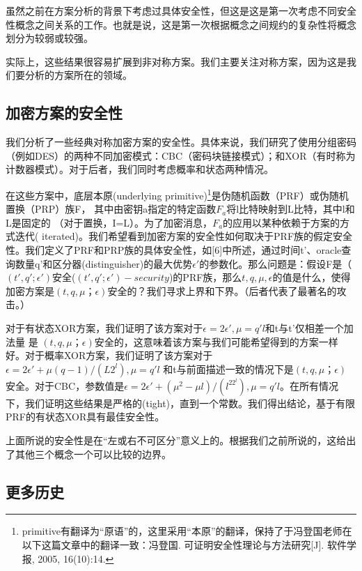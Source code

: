 \documentclass[]{article}
\begin{document}
虽然之前在方案分析的背景下考虑过具体安全性，但这是这是第一次考虑不同安全性概念之间关系的工作。也就是说，这是第一次根据概念之间规约的复杂性将概念划分为较弱或较强。\par

实际上，这些结果很容易扩展到非对称方案。我们主要关注对称方案，因为这是我们要分析的方案所在的领域。

\subsection{加密方案的安全性}

我们分析了一些经典对称加密方案的安全性。具体来说，我们研究了使用分组密码（例如DES）的两种不同加密模式：CBC（密码块链接模式）；和XOR（有时称为计数器模式）。对于后者，我们同时考虑概率和状态两种情况。\par

在这些方案中，底层本原(underlying primitive)\footnote{primitive有翻译为“原语”的，这里采用“本原”的翻译，保持了于冯登国老师在以下这篇文章中的翻译一致：冯登国. 可证明安全性理论与方法研究[J]. 软件学报, 2005, 16(10):14.}是伪随机函数（PRF）或伪随机置换（PRP）族F，
其中由密钥a指定的特定函数$F_a$将l比特映射到L比特，其中l和L是固定的
（对于置换，I=L）。为了加密消息，$F_a$的应用以某种依赖于方案的方式迭代( iterated)。我们希望看到加密方案的安全性如何取决于PRF族的假定安全性。我们定义了PRF和PRP族的具体安全性，如[6]中所述，通过时间t’、oracle查询数量q’和区分器(distinguisher)的最大优势$\epsilon '$的参数化。那么问题是：假设F是（$(t',q';\epsilon ')$安全($(t',q';\epsilon ')-security$)的PRF族，那么$t,q,\mu ,\epsilon$的值是什么，使得加密方案是$(t,q,\mu；\epsilon)$安全的？我们寻求上界和下界。（后者代表了最著名的攻击。）
\par

对于有状态XOR方案，我们证明了该方案对于$\epsilon =2 \epsilon ',\mu =q'l$和t与t’仅相差一个加法量 是 $(t,q,\mu；\epsilon)$安全的，这意味着该方案与我们可能希望得到的方案一样好。对于概率XOR方案，我们证明了该方案对于$\epsilon =2 \epsilon '+\mu (q-1)/(L2^l),\mu =q'l$
和t与前面描述一致的情况下是$(t,q,\mu；\epsilon)$安全。对于CBC，参数值是$\epsilon=2\epsilon '+(\mu^2 - \mu l)/(l^22^l),\mu=q' l$。在所有情况下，我们证明这些结果是严格的(tight)，直到一个常数。我们得出结论，基于有限PRF的有状态XOR具有最佳安全性。
\par

上面所说的安全性是在“左或右不可区分”意义上的。根据我们之前所说的，这给出了其他三个概念一个可以比较的边界。

\subsection{更多历史}
\end{document}
